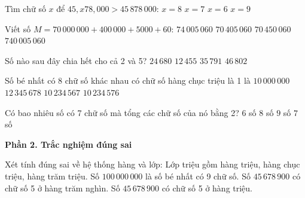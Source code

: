 \begin{ex} %
Tìm chữ số $x$ để $45,x78,000 > 45\,878\,000$:
\choice
{$x = 8$}
{$x = 7$}
{$x = 6$}
{\True $x = 9$}
\end{ex}

\begin{ex} %
Viết số $M = 70\,000\,000 + 400\,000 + 5000 + 60$:
\choice
{$74\,005\,060$}
{\True $70\,405\,060$}
{$70\,450\,060$}
{$740\,005\,060$}
\end{ex}

\begin{ex} %
Số nào sau đây chia hết cho cả 2 và 5?
\choice
{\True $24\,680$}
{$12\,455$}
{$35\,791$}
{$46\,802$}
\end{ex}

\begin{ex} %
Số bé nhất có 8 chữ số khác nhau có chữ số hàng chục triệu là 1 là
\choice
{$10\,000\,000$}
{$12\,345\,678$}
{\True $10\,234\,567$}
{$10\,234\,576$}
\end{ex}

\begin{ex} %
Có bao nhiêu số có 7 chữ số mà tổng các chữ số của nó bằng 2?
\choice
{$6$ số}
{$8$ số}
{$9$ số}
{\True $7$ số}
\end{ex}

\textbf{Phần 2. Trắc nghiệm đúng sai}

\begin{ex} %
Xét tính đúng sai về hệ thống hàng và lớp:
\choiceTF
{\True Lớp triệu gồm hàng triệu, hàng chục triệu, hàng trăm triệu.}
{\True Số $100\,000\,000$ là số bé nhất có 9 chữ số.}
{Số $45\,678\,900$ có chữ số 5 ở hàng trăm nghìn.}
{\True Số $45\,678\,900$ có chữ số 5 ở hàng triệu.}
\end{ex}

